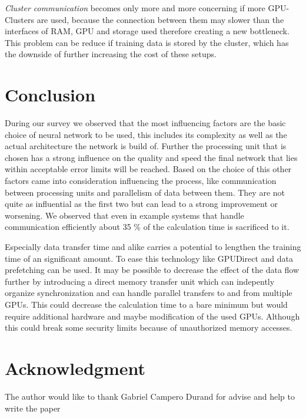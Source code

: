 \documentclass[conference]{IEEEtran}
\begin{document}
\emph{Cluster communication} becomes only more and more concerning if more GPU-Clusters are used, because the connection between them may slower than the interfaces of RAM, GPU and storage used therefore creating a new bottleneck. This problem can be reduce if training data is stored by the cluster, which has the downside of further increasing the cost of these setups.




\section{Conclusion}
During our survey we observed that the most influencing factors are the basic choice of neural network to be used, this includes its complexity as well as the actual architecture the network is build of. Further the processing unit that is chosen has a strong influence on the quality and speed the final network that lies within acceptable error limits will be reached. Based on the choice of this other factors came into consideration influencing the process, like communication between processing units and parallelism of data between them. They are not quite as influential as the first two but can lead to a strong improvement or worsening. We observed that even in example systems that handle communication efficiently about 35 \% of the calculation time is sacrificed to it.

Especially data transfer time and alike carries a potential to lengthen the training time of an significant amount. To ease this technology like GPUDirect\cite{nvidiagpudirect2017} and data prefetching\cite{yang2010gpgpu} can be used. It may be possible to decrease the effect of the data flow further by introducing a direct memory transfer unit which can indepently organize synchronization and can handle parallel transfers to and from multiple GPUs. This could decrease the calculation time to a bare minimum but would require additional hardware and maybe modification of the used GPUs. Although this could break some security limits because of unauthorized memory accesses. 

\section*{Acknowledgment}
The author would like to thank Gabriel Campero Durand for advise and help to write the paper







\end{document}
